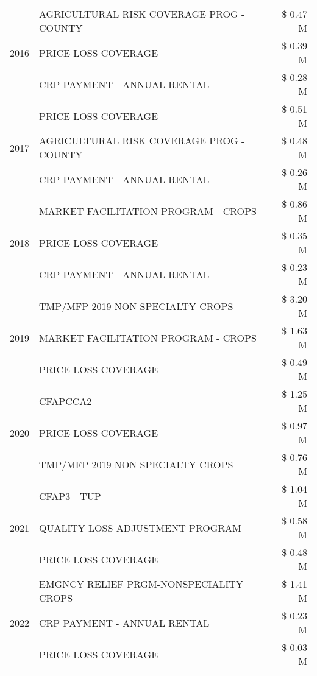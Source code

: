 \begin{tabular}{llr}
\cline{1-3}
\multirow[t]{3}{*}{2016} & AGRICULTURAL RISK COVERAGE PROG - COUNTY & \$ 0.47 M \\
 & PRICE LOSS COVERAGE & \$ 0.39 M \\
 & CRP PAYMENT - ANNUAL RENTAL & \$ 0.28 M \\
\cline{1-3}
\multirow[t]{3}{*}{2017} & PRICE LOSS COVERAGE & \$ 0.51 M \\
 & AGRICULTURAL RISK COVERAGE PROG - COUNTY & \$ 0.48 M \\
 & CRP PAYMENT - ANNUAL RENTAL & \$ 0.26 M \\
\cline{1-3}
\multirow[t]{3}{*}{2018} & MARKET FACILITATION PROGRAM - CROPS & \$ 0.86 M \\
 & PRICE LOSS COVERAGE & \$ 0.35 M \\
 & CRP PAYMENT - ANNUAL RENTAL & \$ 0.23 M \\
\cline{1-3}
\multirow[t]{3}{*}{2019} & TMP/MFP 2019 NON SPECIALTY CROPS & \$ 3.20 M \\
 & MARKET FACILITATION PROGRAM - CROPS & \$ 1.63 M \\
 & PRICE LOSS COVERAGE & \$ 0.49 M \\
\cline{1-3}
\multirow[t]{3}{*}{2020} & CFAPCCA2 & \$ 1.25 M \\
 & PRICE LOSS COVERAGE & \$ 0.97 M \\
 & TMP/MFP 2019 NON SPECIALTY CROPS & \$ 0.76 M \\
\cline{1-3}
\multirow[t]{3}{*}{2021} & CFAP3 - TUP & \$ 1.04 M \\
 & QUALITY LOSS ADJUSTMENT PROGRAM & \$ 0.58 M \\
 & PRICE LOSS COVERAGE & \$ 0.48 M \\
\cline{1-3}
\multirow[t]{3}{*}{2022} & EMGNCY RELIEF PRGM-NONSPECIALITY CROPS & \$ 1.41 M \\
 & CRP PAYMENT - ANNUAL RENTAL & \$ 0.23 M \\
 & PRICE LOSS COVERAGE & \$ 0.03 M \\
\cline{1-3}
\bottomrule
\end{tabular}

